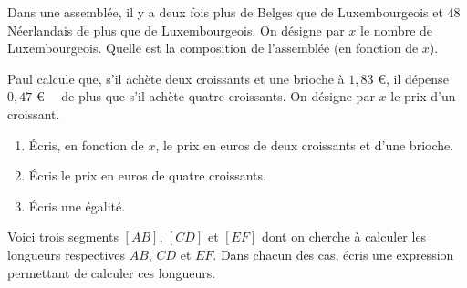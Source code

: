 \documentclass[a4paper,10pt]{report}
\begin{document}
\vspace{-1mm}
\begin{ex}
Dans une assemblée, il y a deux fois plus de Belges que de Luxembourgeois et $48$ Néerlandais de plus que de Luxembourgeois. On désigne par $x$ le nombre de Luxembourgeois. Quelle est la composition de l'assemblée (en fonction de $x$).
\end{ex}

\vspace{-1mm}
\begin{ex}
Paul calcule que, s'il achète deux croissants et une brioche à $1,83$ \euro , il dépense $0,47$ \euro ~~ de plus que s'il achète quatre croissants. On désigne par $x$ le prix d'un croissant.

\begin{enumerate}[font=\color{exer2}]
\item Écris, en fonction de $x$, le prix en euros de deux croissants et d'une brioche.
\item Écris le prix en euros de quatre croissants.
\item Écris une égalité.
\end{enumerate}
\end{ex}

\vspace{-1mm}
\begin{ex}
Voici trois segments $[AB]$, $[CD]$ et $[EF]$ dont on cherche à calculer les longueurs respectives $AB$, $CD$ et $EF$. Dans chacun des cas, écris une expression permettant de calculer ces longueurs.

\begin{center}
\end{center}
\end{ex}
\end{document}
